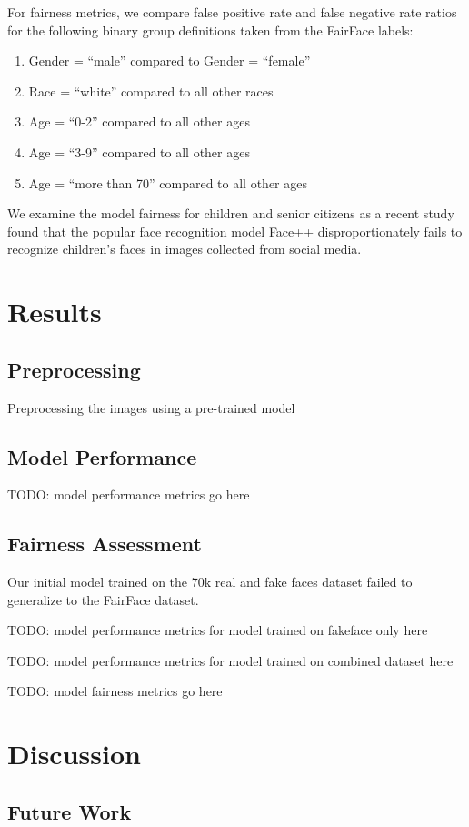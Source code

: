 \documentclass[11pt, letterpaper]{article}
\begin{document}
\begin{multicols}{2}
  For fairness metrics, we compare false positive rate and false negative rate ratios
  for the following binary group definitions taken from the FairFace labels:

  \begin{enumerate}
  \item Gender = ``male'' compared to Gender = ``female''
  \item Race = ``white'' compared to all other races
  \item Age = ``0-2'' compared to all other ages
  \item Age = ``3-9'' compared to all other ages
  \item Age = ``more than 70'' compared to all other ages
  \end{enumerate}

  We examine the model fairness for children and senior citizens as a recent
  study \cite{9156262} found that the popular face recognition model Face++
  disproportionately fails to recognize children's faces in images collected from
  social media.

  \section{Results}

  \subsection{Preprocessing}

  Preprocessing the images using a pre-trained model

  \subsection{Model Performance}

  TODO: model performance metrics go here

  \subsection{Fairness Assessment}

  Our initial model trained on the 70k real and fake faces dataset failed to
  generalize to the FairFace dataset.

  TODO: model performance metrics for model trained on fakeface only here

  TODO: model performance metrics for model trained on combined dataset here

  TODO: model fairness metrics go here

  \section{Discussion}

  \subsection{Future Work}
\end{multicols}



\end{document}
